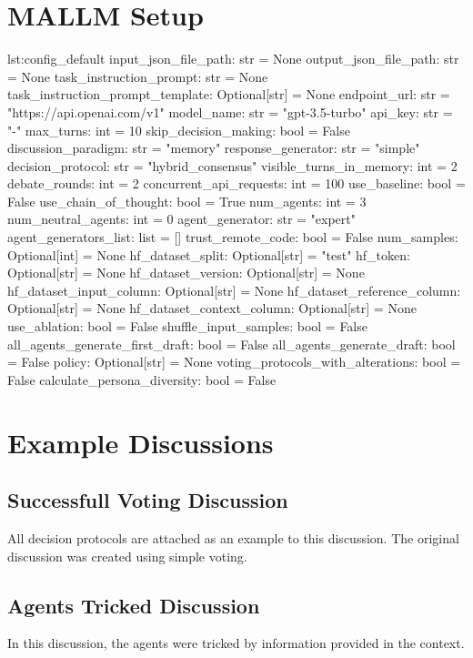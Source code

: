 \section{MALLM Setup}
\label{sec:mallm_setup_app}

    
\begin{configpython}{lst:config_default}
input_json_file_path: str = None
output_json_file_path: str = None
task_instruction_prompt: str = None
task_instruction_prompt_template: Optional[str] = None
endpoint_url: str = "https://api.openai.com/v1"
model_name: str = "gpt-3.5-turbo"
api_key: str = "-"
max_turns: int = 10
skip_decision_making: bool = False
discussion_paradigm: str = "memory"
response_generator: str = "simple"
decision_protocol: str = "hybrid_consensus"
visible_turns_in_memory: int = 2
debate_rounds: int = 2
concurrent_api_requests: int = 100
use_baseline: bool = False
use_chain_of_thought: bool = True
num_agents: int = 3
num_neutral_agents: int = 0
agent_generator: str = "expert"
agent_generators_list: list = []
trust_remote_code: bool = False
num_samples: Optional[int] = None
hf_dataset_split: Optional[str] = "test"
hf_token: Optional[str] = None
hf_dataset_version: Optional[str] = None
hf_dataset_input_column: Optional[str] = None
hf_dataset_reference_column: Optional[str] = None
hf_dataset_context_column: Optional[str] = None
use_ablation: bool = False
shuffle_input_samples: bool = False
all_agents_generate_first_draft: bool = False
all_agents_generate_draft: bool = False
policy: Optional[str] = None
voting_protocols_with_alterations: bool = False
calculate_persona_diversity: bool = False
\end{configpython}
\newpage
\section{Example Discussions}
\subsection{Successfull Voting Discussion}
All decision protocols are attached as an example to this discussion. The original discussion was created using simple voting.

\newpage
\subsection{Agents Tricked Discussion}
In this discussion, the agents were tricked by information provided in the context.

\newpage
